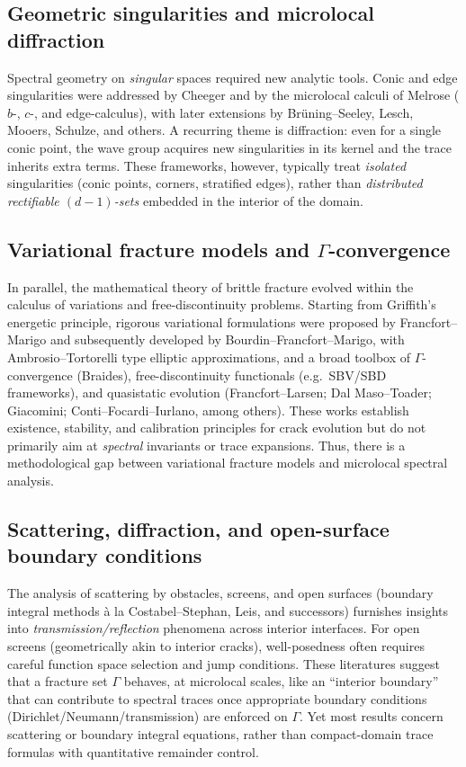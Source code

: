 \subsection*{Geometric singularities and microlocal diffraction}
Spectral geometry on \emph{singular} spaces required new analytic tools. Conic and
edge singularities were addressed by Cheeger and by the microlocal calculi of Melrose
($b$-, $c$-, and edge-calculus), with later extensions by Brüning--Seeley, Lesch, Mooers,
Schulze, and others. A recurring theme is diffraction: even for a single conic point,
the wave group acquires new singularities in its kernel and the trace inherits extra
terms. These frameworks, however, typically treat \emph{isolated} singularities (conic
points, corners, stratified edges), rather than \emph{distributed rectifiable $(d-1)$-sets}
embedded in the interior of the domain.

\subsection*{Variational fracture models and $\Gamma$-convergence}
In parallel, the mathematical theory of brittle fracture evolved within the calculus
of variations and free-discontinuity problems. Starting from Griffith’s energetic
principle, rigorous variational formulations were proposed by Francfort--Marigo and
subsequently developed by Bourdin--Francfort--Marigo, with Ambrosio--Tortorelli
type elliptic approximations, and a broad toolbox of $\Gamma$-convergence (Braides),
free-discontinuity functionals (e.g.\ SBV/SBD frameworks), and quasistatic evolution
(Francfort--Larsen; Dal Maso--Toader; Giacomini; Conti--Focardi--Iurlano, among others).
These works establish existence, stability, and calibration principles for crack
evolution but do not primarily aim at \emph{spectral} invariants or trace expansions.
Thus, there is a methodological gap between variational fracture models and
microlocal spectral analysis.

\subsection*{Scattering, diffraction, and open-surface boundary conditions}
The analysis of scattering by obstacles, screens, and open surfaces (boundary integral
methods à la Costabel--Stephan, Leis, and successors) furnishes insights into
\emph{transmission/reflection} phenomena across interior interfaces. For open screens
(geometrically akin to interior cracks), well-posedness often requires careful function
space selection and jump conditions. These literatures suggest that a fracture set
$\Gamma$ behaves, at microlocal scales, like an ``interior boundary'' that can contribute
to spectral traces once appropriate boundary conditions (Dirichlet/Neumann/transmission)
are enforced on $\Gamma$. Yet most results concern scattering or boundary integral
equations, rather than compact-domain trace formulas with quantitative remainder
control.

